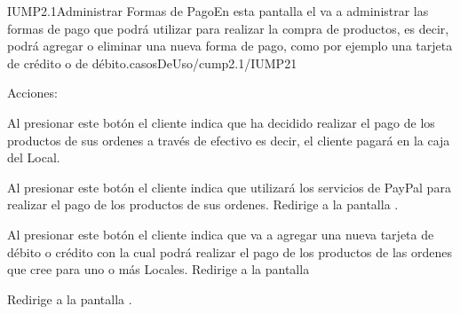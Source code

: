\begin{IU}{IUMP2.1}{Administrar Formas de Pago}{En esta pantalla el  va a administrar las formas de pago que podrá utilizar para realizar la compra de productos, es decir, podrá agregar o eliminar una nueva forma de pago, como por ejemplo una tarjeta de crédito o de débito.}{casosDeUso/cump2.1/IUMP21}
	\item[Acciones:]\hspace{1pt}
		\begin{Citemize}
			\item {} Al presionar este botón el cliente indica que ha decidido realizar el pago de los productos de sus ordenes a través de efectivo es decir, el cliente pagará en la caja del Local.
			\item {} Al presionar este botón el cliente indica que utilizará los servicios de PayPal para realizar el pago de los productos de sus ordenes.  Redirige a la pantalla .
			\item {} Al presionar este botón el cliente indica que va a agregar una nueva tarjeta de débito o crédito con la cual podrá realizar el pago de los productos de las ordenes que cree para uno o más Locales. Redirige a la pantalla 
			\item \backIcon{} Redirige a la pantalla .
		\end{Citemize}

\end{IU}